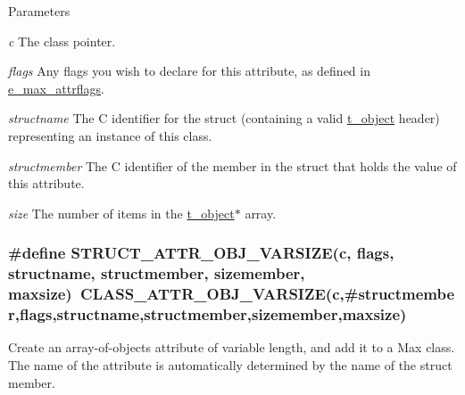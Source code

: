 \begin{DoxyParams}{Parameters}
\item[{\em c}]The class pointer. \item[{\em flags}]Any flags you wish to declare for this attribute, as defined in \hyperlink{group__attr_gaf296cfc6741bb19207f6ed8062809115}{e\_\-max\_\-attrflags}. \item[{\em structname}]The C identifier for the struct (containing a valid \hyperlink{structt__object}{t\_\-object} header) representing an instance of this class. \item[{\em structmember}]The C identifier of the member in the struct that holds the value of this attribute. \item[{\em size}]The number of items in the \hyperlink{structt__object}{t\_\-object}$\ast$ array. \end{DoxyParams}
\hypertarget{group__attr_gab7a7a2956ee6a7fddfc5ee6dae1609b0}{
\subsubsection[{STRUCT\_\-ATTR\_\-OBJ\_\-VARSIZE}]{\setlength{\rightskip}{0pt plus 5cm}\#define STRUCT\_\-ATTR\_\-OBJ\_\-VARSIZE(c, \/  flags, \/  structname, \/  structmember, \/  sizemember, \/  maxsize)~CLASS\_\-ATTR\_\-OBJ\_\-VARSIZE(c,\#structmember,flags,structname,structmember,sizemember,maxsize)}}
\label{group__attr_gab7a7a2956ee6a7fddfc5ee6dae1609b0}


Create an array-\/of-\/objects attribute of variable length, and add it to a Max class. The name of the attribute is automatically determined by the name of the struct member.


